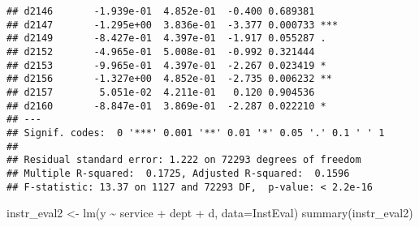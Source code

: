 \documentclass[
]{article}
\newenvironment{Shaded}{\begin{snugshade}}{\end{snugshade}}
\newcommand{\AttributeTok}[1]{\textcolor[rgb]{0.77,0.63,0.00}{#1}}
\newcommand{\FunctionTok}[1]{\textcolor[rgb]{0.00,0.00,0.00}{#1}}
\newcommand{\NormalTok}[1]{#1}
\newcommand{\OtherTok}[1]{\textcolor[rgb]{0.56,0.35,0.01}{#1}}
\newcommand{\SpecialCharTok}[1]{\textcolor[rgb]{0.00,0.00,0.00}{#1}}
\begin{document}
\begin{verbatim}
## d2146       -1.939e-01  4.852e-01  -0.400 0.689381    
## d2147       -1.295e+00  3.836e-01  -3.377 0.000733 ***
## d2149       -8.427e-01  4.397e-01  -1.917 0.055287 .  
## d2152       -4.965e-01  5.008e-01  -0.992 0.321444    
## d2153       -9.965e-01  4.397e-01  -2.267 0.023419 *  
## d2156       -1.327e+00  4.852e-01  -2.735 0.006232 ** 
## d2157        5.051e-02  4.211e-01   0.120 0.904536    
## d2160       -8.847e-01  3.869e-01  -2.287 0.022210 *  
## ---
## Signif. codes:  0 '***' 0.001 '**' 0.01 '*' 0.05 '.' 0.1 ' ' 1
## 
## Residual standard error: 1.222 on 72293 degrees of freedom
## Multiple R-squared:  0.1725, Adjusted R-squared:  0.1596 
## F-statistic: 13.37 on 1127 and 72293 DF,  p-value: < 2.2e-16
\end{verbatim}

\begin{Shaded}
\begin{Highlighting}[]
\NormalTok{instr\_eval2 }\OtherTok{\textless{}{-}} \FunctionTok{lm}\NormalTok{(y }\SpecialCharTok{\textasciitilde{}}\NormalTok{ service }\SpecialCharTok{+}\NormalTok{ dept }\SpecialCharTok{+}\NormalTok{ d, }\AttributeTok{data=}\NormalTok{InstEval)}
\FunctionTok{summary}\NormalTok{(instr\_eval2)}
\end{Highlighting}
\end{Shaded}
\end{document}
